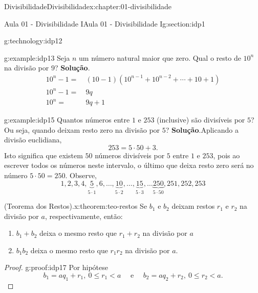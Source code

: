 \documentclass[oneside,10pt,]{book}
\newcommand{\blocktitlefont}{\relax}
\numberwithin{equation}{section}
\newcommand{\lt}{<}
\newcommand{\amp}{&}
\begin{document}
\begin{chapterptx}{Divisibilidade}{}{Divisibilidade}{}{}{x:chapter:01-divisibilidade}
\begin{sectionptx}{Aula 01 - Divisibilidade I}{}{Aula 01 - Divisibilidade I}{}{}{g:section:idp1}
\begin{technology}{}{g:technology:idp12}
\begin{sageoutput}
\end{sageoutput}
%
\end{technology}
\begin{example}{}{g:example:idp13}%
Seja \(n\) um número natural maior que zero. Qual o resto de \(10^n\) na divisão por \(9\)?%
\textbf{\blocktitlefont Solução}.\hypertarget{g:solution:idp14}{}\quad{}%
\begin{align*}
10^n-1=\amp~ (10-1)(10^{n-1}+10^{n-2}+\cdots+10+1)\\
10^n-1=\amp~9q\\
10^n=\amp~ 9q+1
\end{align*}
%
\end{example}
\begin{example}{}{g:example:idp15}%
Quantos números entre \(1\) e \(253\) (inclusive) são divisíveis por \(5\)? Ou seja, quando deixam resto zero na divisão por \(5\)?%
\textbf{\blocktitlefont Solução}.\hypertarget{g:solution:idp16}{}\quad{}Aplicando a divisão euclidiana,%
\begin{equation*}
253 = 5\cdot 50 + 3.
\end{equation*}
Isto significa que existem \(50\) números divisíveis por \(5\) entre \(1\) e \(253\), pois ao escrever todos os números neste intervalo, o último que deixa resto zero será no número \(5\cdot 50 = 250\). Observe,%
\begin{equation*}
1, 2, 3, 4, \underbrace{5}_{5\cdot1}, 6, \ldots,\underbrace{10}_{5\cdot2}, \ldots, \underbrace{15}_{5\cdot3}, \ldots \underbrace{250}_{5\cdot50}, 251, 252, 253 
\end{equation*}
%
\end{example}
\begin{theorem}{(Teorema dos Restos).}{}{x:theorem:teo-restos}%
Se \(b_1\) e \(b_2\) deixam restos \(r_1\) e \(r_2\) na divisão por \(a\), respectivamente, então:%
%
\begin{enumerate}[label=\roman*]
\item{}\(b_1 + b_2\) deixa o mesmo resto que \(r_1 + r_2\) na divisão por \(a\)%
\item{}\(b_1 b_2\) deixa o mesmo resto que \(r_1 r_2\) na divisão por \(a\).%
\end{enumerate}
\end{theorem}
\begin{proof}{}{g:proof:idp17}
Por hipótese%
\begin{equation*}
b_1 = aq_1+r_1, ~ 0\leq r_1\lt a \quad \text{ e }\quad b_2 = aq_2+r_2, ~ 0\leq r_2\lt a.
\end{equation*}
%

\end{proof}
\end{sectionptx}
\end{chapterptx}
\end{document}
